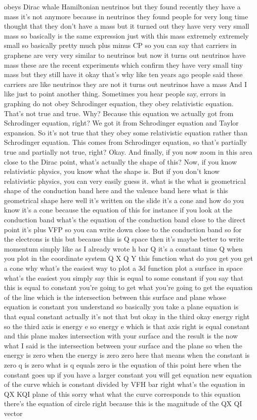 obeys Dirac whale Hamiltonian neutrinos but they found recently they have a mass it's not anymore because in neutrinos they found people for very long time thought that they don't have a mass but it turned out they have very very small mass so basically is the same expression just with this mass extremely extremely small so basically pretty much plus minus CP so you can say that carriers in graphene are very very similar to neutrinos but now it turns out neutrinos have mass these are the recent experiments which confirm they have very small tiny mass but they still have it okay that's why like ten years ago people said these carriers are like neutrinos they are not it turns out neutrinos have a mass And I like just to point another thing. Sometimes you hear people say, errors in graphing do not obey Schrodinger equation, they obey relativistic equation. That's not true and true. Why? Because this equation we actually got from Schrodinger equation, right? We got it from Schrodinger equation and Taylor expansion. So it's not true that they obey some relativistic equation rather than Schrodinger equation. This comes from Schrodinger equation, so that's partially true and partially not true, right? Okay. And finally, if you now zoom in this area close to the Dirac point, what's actually the shape of this? Now, if you know relativistic physics, you know what the shape is. But if you don't know relativistic physics, you can very easily guess it. what is the what is geometrical shape of the conduction band here and the valence band here what is this geometrical shape here well it's written on the slide it's a cone and how do you know it's a cone because the equation of this for instance if you look at the conduction band what's the equation of the conduction band close to the direct point it's plus VFP so you can write down close to the conduction band so for the electrons is this but because this is Q space then it's maybe better to write momentum simply like as I already wrote h bar Q it's a constant time Q when you plot in the coordinate system Q X Q Y this function what do you get you get a cone why what's the easiest way to plot a 3d function plot a surface in space what's the easiest you simply say this is equal to some constant if you say that this is equal to constant you're going to get what you're going to get the equation of the line which is the intersection between this surface and plane whose equation is constant you understand so basically you take a plane equation is that equal constant actually it's not that but okay in the third okay energy right so the third axis is energy e so energy e which is that axis right is equal constant and this plane makes intersection with your surface and the result is the now what I said is the intersection between your surface and the plane so when the energy is zero when the energy is zero zero here that means when the constant is zero q is zero what is q equals zero is the equation of this point here when the constant goes up if you have a larger constant you will get equation new equation of the curve which is constant divided by VFH bar right what's the equation in QX KQI plane of this sorry what what the curve corresponds to this equation there's the equation of circle right because this is the magnitude of the QX QI vector 
